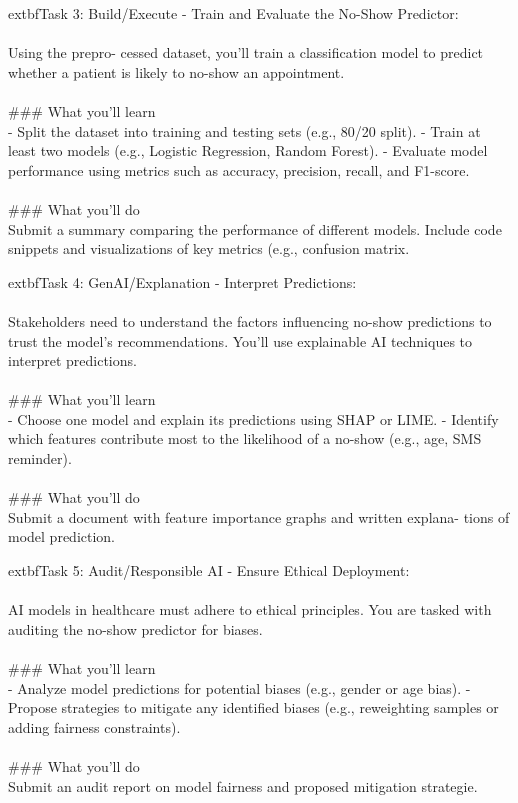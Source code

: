 \documentclass{article}
\begin{document}
	extbf{Task 3:} Build/Execute - Train and Evaluate the No-Show Predictor:  \\
 \\
 Using the prepro- cessed dataset, you’ll train a classification model to predict whether a patient is likely to no-show an appointment. \\
 \\
### What you'll learn \\
- Split the dataset into training and testing sets (e.g., 80/20 split). - Train at least two models (e.g., Logistic Regression, Random Forest). - Evaluate model performance using metrics such as accuracy, precision, recall, and F1-score. \\
 \\
### What you'll do \\
Submit a summary comparing the performance of different models. Include code snippets and visualizations of key metrics (e.g., confusion matrix.

	extbf{Task 4:} GenAI/Explanation - Interpret Predictions:  \\
 \\
 Stakeholders need to understand the factors influencing no-show predictions to trust the model’s recommendations. You’ll use explainable AI techniques to interpret predictions. \\
 \\
### What you'll learn \\
- Choose one model and explain its predictions using SHAP or LIME. - Identify which features contribute most to the likelihood of a no-show (e.g., age, SMS reminder). \\
 \\
### What you'll do \\
Submit a document with feature importance graphs and written explana- tions of model prediction.

	extbf{Task 5:} Audit/Responsible AI - Ensure Ethical Deployment:  \\
 \\
 AI models in healthcare must adhere to ethical principles. You are tasked with auditing the no-show predictor for biases. \\
 \\
### What you'll learn \\
- Analyze model predictions for potential biases (e.g., gender or age bias). - Propose strategies to mitigate any identified biases (e.g., reweighting samples or adding fairness constraints). \\
 \\
### What you'll do \\
Submit an audit report on model fairness and proposed mitigation strategie.
\end{document}
